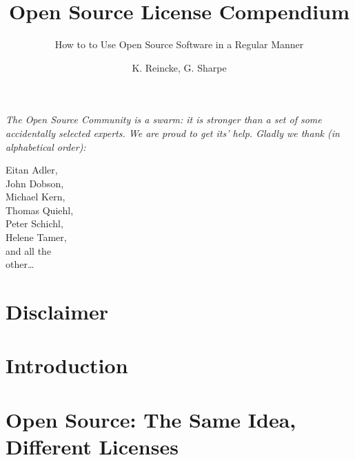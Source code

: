 \documentclass[DIV=calc,BCOR=5mm,12pt,headings=small,oneside,toc=bib]{scrbook}
\begin{document}

\titlehead{Release }
\subject{\small \itshape A Practical Guide for Developers, Managers, Companies,
and OS Experts}
\title{Open Source License Compendium}
\subtitle{How to to Use Open Source Software in a Regular Manner}
\author{K. Reincke, G. Sharpe }
\maketitle

\footnotesize
\begin{flushright} 

\parbox{100mm}{\itshape
The Open Source Community is a swarm: it is stronger than a set of some
accidentally selected experts. We are proud to get its' help. Gladly we thank
(in alphabetical order):
}

\parbox{50mm}{
\tiny
\begin{flushright}
Eitan Adler,\\
John Dobson, \\
Michael Kern,\\
Thomas Quiehl,\\
Peter Schichl,\\
Helene Tamer,\\
and all the \\
other\ldots
\end{flushright}
}
\end{flushright}
\normalsize
\newpage

\footnotesize
\tableofcontents
\newpage

\normalsize

\chapter*{Disclaimer}


\chapter{Introduction}



%

\chapter{Open Source: The Same Idea, Different Licenses}


\end{document}
